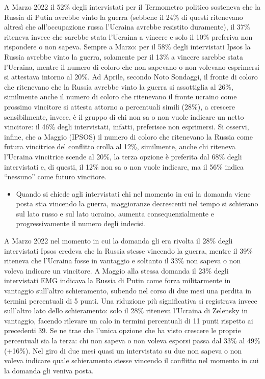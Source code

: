 \documentclass[
]{book}
\providecommand{\tightlist}{%
  \setlength{\itemsep}{0pt}\setlength{\parskip}{0pt}}
\begin{document}
A Marzo 2022 il 52\% degli intervistati per il Termometro politico sosteneva che la Russia di Putin avrebbe vinto la guerra (sebbene il 24\% di questi ritenevano altresì che all'occupazione russa l'Ucraina avrebbe resistito duramente), il 37\% riteneva invece che sarebbe stata l'Ucraina a vincere e solo il 10\% preferiva non rispondere o non sapeva. Sempre a Marzo: per il 58\% degli intervistati Ipsos la Russia avrebbe vinto la guerra, solamente per il 13\% a vincere sarebbe stata l'Ucraina, mentre il numero di coloro che non sapevano o non volevano esprimersi si attestava intorno al 20\%.
Ad Aprile, secondo Noto Sondaggi, il fronte di coloro che ritenevano che la Russia avrebbe vinto la guerra si assottiglia al 26\%, similmente anche il numero di coloro che ritenevano il fronte ucraino come prossimo vincitore si attesta attorno a percentuali simili (28\%), a crescere sensibilmente, invece, è il gruppo di chi non sa o non vuole indicare un netto vincitore: il 46\% degli intervistati, infatti, preferisce non esprimersi.
Si osservi, infine, che a Maggio (IPSOS) il numero di coloro che ritenevano la Russia come futura vincitrice del conflitto crolla al 12\%, similmente, anche chi riteneva l'Ucraina vincitrice scende al 20\%, la terza opzione è preferita dal 68\% degli intervistati e, di questi, il 12\% non sa o non vuole indicare, ma il 56\% indica ``nessuno'' come futuro vincitore.

\begin{itemize}
\tightlist
\item
  Quando si chiede agli intervistati chi nel momento in cui la domanda viene posta stia vincendo la guerra, maggioranze decrescenti nel tempo si schierano sul lato russo e sul lato ucraino, aumenta consequenzialmente e progressivamente il numero degli indecisi.
\end{itemize}

A Marzo 2022 nel momento in cui la domanda gli era rivolta il 28\% degli intervistati Ipsos credeva che la Russia stesse vincendo la guerra, mentre il 39\% riteneva che l'Ucraina fosse in vantaggio e soltanto il 33\% non sapeva o non voleva indicare un vincitore.
A Maggio alla stessa domanda il 23\% degli intervistati EMG indicava la Russia di Putin come forza militarmente in vantaggio sull'altro schieramento, subendo nel corso di due mesi una perdita in termini percentuali di 5 punti. Una riduzione più significativa si registrava invece sull'altro lato dello schieramento: solo il 28\% riteneva l'Ucraina di Zelensky in vantaggio, facendo rilevare un calo in termini percentuali di 11 punti rispetto ai precedenti 39. Se ne trae che l'unica opzione che ha visto crescere le proprie percentuali sia la terza: chi non sapeva o non voleva esporsi passa dal 33\% al 49\% (+16\%). Nel giro di due mesi quasi un intervistato su due non sapeva o non voleva indicare quale schieramento stesse vincendo il conflitto nel momento in cui la domanda gli veniva posta.
\end{document}
